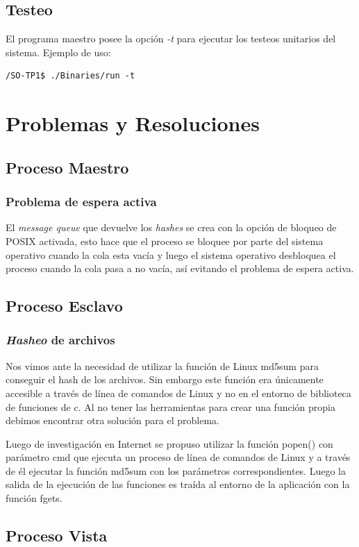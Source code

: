 \documentclass[10pt,a4paper]{report}
\begin{document}
\section{Testeo}
El programa maestro posee la opción \textit{-t} para ejecutar los testeos unitarios del sistema. Ejemplo de uso:
\begin{lstlisting}
/SO-TP1$ ./Binaries/run -t
\end{lstlisting}

\chapter{Problemas y Resoluciones}
\section{Proceso Maestro}
\subsection{Problema de espera activa}
El \textit{message queue} que devuelve los \textit{hashes} se crea con la opción de bloqueo de POSIX activada, esto hace que el proceso se bloquee por parte del sistema operativo cuando la cola esta vacía y luego el sistema operativo desbloquea el proceso cuando la cola pasa a no vacía, así evitando el problema de espera activa.
\section{Proceso Esclavo}
\subsection{\textit{Hasheo} de archivos}
Nos vimos ante la necesidad de utilizar la función de Linux md5sum para conseguir el hash de los archivos. Sin embargo este función
era únicamente accesible a través de línea de comandos de Linux y no en el entorno de biblioteca de funciones de c. Al no tener las
herramientas para crear una función propia debimos encontrar otra solución para el problema.

Luego de investigación en Internet se propuso utilizar la función popen() con parámetro cmd que ejecuta un proceso de línea de comandos
de Linux y a través de él ejecutar la función md5sum con los parámetros correspondientes. Luego la salida de la ejecución de las funciones
es traída al entorno de la aplicación con la función fgets.
\section{Proceso Vista}
\end{document}
